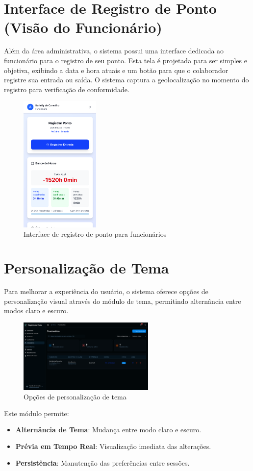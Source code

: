 \section{Interface de Registro de Ponto (Visão do Funcionário)}

Além da área administrativa, o sistema possui uma interface dedicada ao funcionário para o registro de seu ponto. Esta tela é projetada para ser simples e objetiva, exibindo a data e hora atuais e um botão para que o colaborador registre sua entrada ou saída. O sistema captura a geolocalização no momento do registro para verificação de conformidade.

\begin{figure}[H]
\centering
\includegraphics[width=0.35\textwidth]{imagens/registro-ponto-funcionario.png}
\caption{Interface de registro de ponto para funcionários}
\label{fig:registro-ponto-funcionario}
\end{figure}

\section{Personalização de Tema}

Para melhorar a experiência do usuário, o sistema oferece opções de personalização visual através do módulo de tema, permitindo alternância entre modos claro e escuro.

\begin{figure}[H]
\centering
\includegraphics[width=0.6\textwidth]{imagens/configuracao-tema.png}
\caption{Opções de personalização de tema}
\label{fig:configuracao-tema}
\end{figure}

Este módulo permite:

\begin{itemize}
\item \textbf{Alternância de Tema}: Mudança entre modo claro e escuro.
\item \textbf{Prévia em Tempo Real}: Visualização imediata das alterações.
\item \textbf{Persistência}: Manutenção das preferências entre sessões.
\end{itemize}